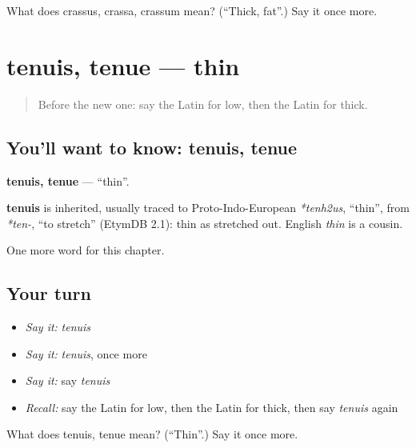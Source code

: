 \begin{tcolorbox}[breakable,colback=teal!4,colframe=teal!35!black,title={Before you move on}]
What does crassus, crassa, crassum mean? (\textquotedblleft{}Thick, fat\textquotedblright{}.) Say it once more.
\end{tcolorbox}
\section[tenuis, tenue]{tenuis, tenue — thin}

\label{lesson:LA-C144-tenuis}



\begin{quote}
Before the new one: say the Latin for low, then the Latin for thick.
\end{quote}

\subsection*{You'll want to know: tenuis, tenue}
\textbf{tenuis, tenue} — \textquotedblleft{}thin\textquotedblright{}.

\begin{cousinweb}
\textbf{tenuis} is inherited, usually traced to Proto-Indo-European \emph{*tenh2us}, \textquotedblleft{}thin\textquotedblright{}, from \emph{*ten-}, \textquotedblleft{}to stretch\textquotedblright{} (EtymDB 2.1): thin as stretched out. English \emph{thin} is a cousin.
\end{cousinweb}

\begin{grammarlens}[title={What you've built}]
One more word for this chapter.
\end{grammarlens}

\subsection*{Your turn}
\begin{itemize}
\raggedright
  \item \emph{Say it:} \emph{tenuis}
  \item \emph{Say it:} \emph{tenuis}, once more
  \item \emph{Say it:} say \emph{tenuis}
  \item \emph{Recall:} say the Latin for low, then the Latin for thick, then say \emph{tenuis} again
\end{itemize}

\begin{tcolorbox}[breakable,colback=teal!4,colframe=teal!35!black,title={Before you move on}]
What does tenuis, tenue mean? (\textquotedblleft{}Thin\textquotedblright{}.) Say it once more.
\end{tcolorbox}
